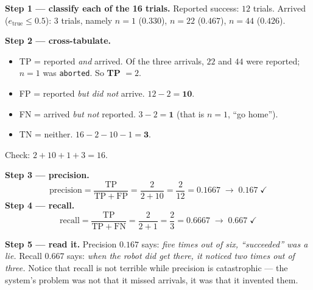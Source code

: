 \documentclass[11pt,a4paper]{report}
\newcommand{\file}[1]{\texttt{\small #1}}
\begin{document}
\begin{handbox}
\textbf{Step 1 --- classify each of the 16 trials.} Reported success:
$12$ trials. Arrived ($e_{\text{true}} \le 0.5$): $3$ trials, namely
$n = 1$ ($0.330$), $n = 22$ ($0.467$), $n = 44$ ($0.426$).

\smallskip
\textbf{Step 2 --- cross-tabulate.}
\begin{itemize}[leftmargin=1.4em,itemsep=1pt]
\item TP = reported \emph{and} arrived. Of the three arrivals, $22$ and $44$
were reported; $n = 1$ was \file{aborted}. So \textbf{TP} $= 2$.
\item FP = reported \emph{but did not} arrive. $12 - 2 = \mathbf{10}$.
\item FN = arrived \emph{but not} reported. $3 - 2 = \mathbf{1}$ (that is
$n = 1$, ``go home'').
\item TN = neither. $16 - 2 - 10 - 1 = \mathbf{3}$.
\end{itemize}
Check: $2 + 10 + 1 + 3 = 16$. \checkmark

\smallskip
\textbf{Step 3 --- precision.}
\[
\text{precision} = \frac{\mathrm{TP}}{\mathrm{TP} + \mathrm{FP}}
= \frac{2}{2 + 10} = \frac{2}{12} = 0.1667 \;\rightarrow\; \mathbf{0.167}\;\checkmark
\]
\textbf{Step 4 --- recall.}
\[
\text{recall} = \frac{\mathrm{TP}}{\mathrm{TP} + \mathrm{FN}}
= \frac{2}{2 + 1} = \frac{2}{3} = 0.6667 \;\rightarrow\; \mathbf{0.667}\;\checkmark
\]

\smallskip
\textbf{Step 5 --- read it.} Precision $0.167$ says: \emph{five times out of
six, ``succeeded'' was a lie.} Recall $0.667$ says: \emph{when the robot did get
there, it noticed two times out of three.} Notice that recall is not terrible
while precision is catastrophic --- the system's problem was not that it
missed arrivals, it was that it invented them.
\end{handbox}
\end{document}
